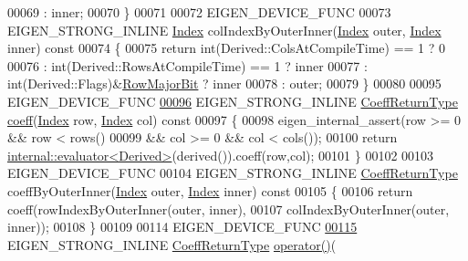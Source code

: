 \begin{DoxyCode}
00069           : inner;
00070     \}
00071 
00072     EIGEN\_DEVICE\_FUNC
00073     EIGEN\_STRONG\_INLINE \hyperlink{namespace_eigen_a62e77e0933482dafde8fe197d9a2cfde}{Index} colIndexByOuterInner(\hyperlink{namespace_eigen_a62e77e0933482dafde8fe197d9a2cfde}{Index} outer, \hyperlink{namespace_eigen_a62e77e0933482dafde8fe197d9a2cfde}{Index} inner)\textcolor{keyword}{ const}
00074 \textcolor{keyword}{    }\{
00075       \textcolor{keywordflow}{return} int(Derived::ColsAtCompileTime) == 1 ? 0
00076           : int(Derived::RowsAtCompileTime) == 1 ? inner
00077           : int(Derived::Flags)&\hyperlink{group__flags_gae4f56c2a60bbe4bd2e44c5b19cbe8762}{RowMajorBit} ? inner
00078           : outer;
00079     \}
00080 
00095     EIGEN\_DEVICE\_FUNC
\hyperlink{group___core___module_ad41647ef695f9a5a58a9a0f50e2ae064}{00096}     EIGEN\_STRONG\_INLINE \hyperlink{class_eigen_1_1internal_1_1_tensor_lazy_evaluator_writable}{CoeffReturnType} \hyperlink{group___core___module_ad41647ef695f9a5a58a9a0f50e2ae064}{coeff}(\hyperlink{group___core___module_a554f30542cc2316add4b1ea0a492ff02}{Index} row, 
      \hyperlink{group___core___module_a554f30542cc2316add4b1ea0a492ff02}{Index} col)\textcolor{keyword}{ const}
00097 \textcolor{keyword}{    }\{
00098       eigen\_internal\_assert(row >= 0 && row < rows()
00099                          && col >= 0 && col < cols());
00100       \textcolor{keywordflow}{return} \hyperlink{struct_eigen_1_1internal_1_1evaluator}{internal::evaluator<Derived>}(derived()).coeff(row,col);
00101     \}
00102 
00103     EIGEN\_DEVICE\_FUNC
00104     EIGEN\_STRONG\_INLINE \hyperlink{class_eigen_1_1internal_1_1_tensor_lazy_evaluator_writable}{CoeffReturnType} coeffByOuterInner(\hyperlink{group___core___module_a554f30542cc2316add4b1ea0a492ff02}{Index} outer, 
      \hyperlink{group___core___module_a554f30542cc2316add4b1ea0a492ff02}{Index} inner)\textcolor{keyword}{ const}
00105 \textcolor{keyword}{    }\{
00106       \textcolor{keywordflow}{return} coeff(rowIndexByOuterInner(outer, inner),
00107                    colIndexByOuterInner(outer, inner));
00108     \}
00109 
00114     EIGEN\_DEVICE\_FUNC
\hyperlink{group___core___module_a29ac34389e098ec963ebb2ebd351335a}{00115}     EIGEN\_STRONG\_INLINE \hyperlink{class_eigen_1_1internal_1_1_tensor_lazy_evaluator_writable}{CoeffReturnType} \hyperlink{group___core___module_a29ac34389e098ec963ebb2ebd351335a}{operator()}(

\end{DoxyCode}
